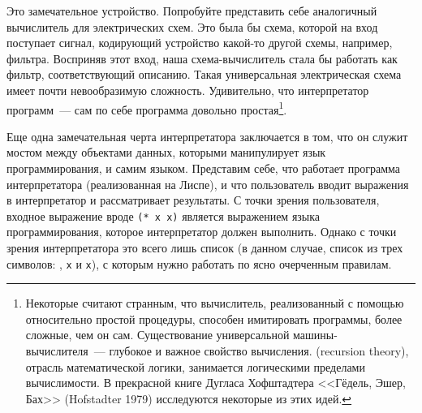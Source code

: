 Это замечательное устройство.  Попробуйте представить себе аналогичный
вычислитель для электрических схем.  Это была бы схема, которой на
вход поступает сигнал, кодирующий устройство какой-то другой
схемы, например, фильтра.  Восприняв этот вход, наша схема-вычислитель
стала бы работать как фильтр, соответствующий описанию.  Такая
универсальная электрическая схема имеет почти невообразимую
сложность.  Удивительно, что интерпретатор программ~--- сам по себе
программа довольно простая\footnote{Некоторые считают странным, что 
вычислитель,
реализованный с помощью относительно простой процедуры, способен
имитировать программы, более сложные, чем он сам.  Существование
универсальной машины-вычислителя~--- глубокое и важное свойство
вычисления. 
 (recursion theory),
отрасль математической логики, занимается логическими пределами
вычислимости.  В прекрасной книге Дугласа Хофштадтера <<Гёдель,
Эшер, Бах>> (Hofstadter 1979) исследуются некоторые из этих идей.}.

Еще одна замечательная черта интерпретатора заключается в
том, что он служит мостом между объектами данных, которыми
манипулирует язык программирования, и самим языком.  Представим себе,
что работает программа интерпретатора (реализованная на Лиспе), и что
пользователь вводит выражения в интерпретатор и рассматривает
результаты.  С точки зрения пользователя, входное выражение вроде
{\tt (* x x)} является выражением языка программирования,
которое интерпретатор должен выполнить. Однако с точки зрения
интерпретатора это всего лишь список (в данном случае, список из трех
символов: {\tt *}, {\tt x} и {\tt x}), с которым
нужно работать по ясно очерченным правилам.

